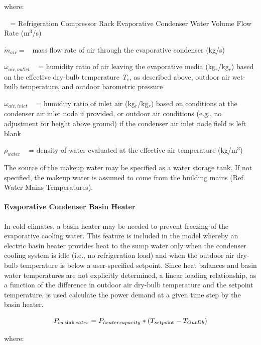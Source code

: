 where:

\(\mathop {{{\dot V}_{evaporation,makeup}}}\limits^{}\) = Refrigeration Compressor Rack Evaporative Condenser Water Volume Flow Rate (m\(^{3}\)/s)

\(\dot m_{air} = \) ~mass flow rate of air through the evaporative condenser (kg/s)

\({\omega_{air,outlet}}\) ~ = humidity ratio of air leaving the evaporative media (kg\(_{r}\)/kg\(_{r}\)) based on the effective dry-bulb temperature \emph{T\(_{e}\)}, as described above, outdoor air wet-bulb temperature, and outdoor barometric pressure

\({\omega_{air,inlet}}\) ~ = humidity ratio of inlet air (kg\(_{r}\)/kg\(_{r}\)) based on conditions at the condenser air inlet node if provided, or outdoor air conditions (e.g., no adjustment for height above ground) if the condenser air inlet node field is left blank

\({\rho_{water}}\) ~ = density of water evaluated at the effective air temperature (kg/m\(^{3}\))

The source of the makeup water may be specified as a water storage tank. If not specified, the makeup water is assumed to come from the building mains (Ref. Water Mains Temperatures).

\paragraph{Evaporative Condenser Basin Heater}\label{evaporative-condenser-basin-heater}

In cold climates, a basin heater may be needed to prevent freezing of the evaporative cooling water. This feature is included in the model whereby an electric basin heater provides heat to the sump water only when the condenser cooling system is idle (i.e., no refrigeration load) and when the outdoor air dry-bulb temperature is below a user-specified setpoint. Since heat balances and basin water temperatures are not explicitly determined, a linear loading relationship, as a function of the difference in outdoor air dry-bulb temperature and the setpoint temperature, is used calculate the power demand at a given time step by the basin heater.

\begin{equation}
{P_{ba\sinh eater}} = {P_{heatercapacity}}*({T_{setpo{\mathop{\rm int}} }} - {T_{OutDb}})
\end{equation}

where:

